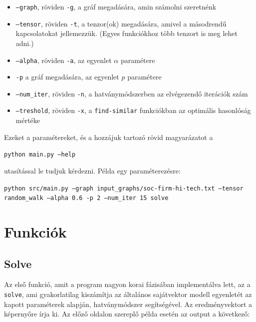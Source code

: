\documentclass[12pt,numbers=noenddot]{report}
\begin{document}
\begin{itemize}
	\item \texttt{--graph}, röviden \texttt{-g}, a gráf megadására, 
		amin számolni szeretnénk
	\item \texttt{--tensor}, röviden \texttt{-t}, a tenzor(ok) megadására, 
		amivel a másodrendű kapcsolatokat jellemezzük. 
		(Egyes funkciókhoz több tenzort is meg lehet adni.)
	\item \texttt{--alpha}, röviden \texttt{-a}, az egyenlet $\alpha$ paramétere
	\item \texttt{-p} a gráf megadására, az egyenlet $p$ paramétere
	\item \texttt{--num\_iter}, röviden \texttt{-n}, a hatványmódszerben az 
		elvégezendő iterációk szám
	\item \texttt{--treshold}, röviden \texttt{-x}, a \texttt{find-similar} 
		funkciókban az optimális hasonlóság mértéke
\end{itemize}

\noindent
Ezeket a paramétereket, és a hozzájuk tartozó rövid magyarázatot a

\texttt{python main.py --help}

\noindent
utasítással le tudjuk kérdezni.
Példa egy paraméterezésre:

\texttt{python src/main.py --graph input\_graphs/soc-firm-hi-tech.txt --tensor random\_walk --alpha 0.6 -p 2 --num\_iter 15 solve}



\chapter{Funkciók}


\section{Solve}

Az első funkció, amit a program nagyon korai fázisában implementálva lett, 
az a \texttt{solve}, ami gyakorlatilag kiszámítja az általános sajátvektor 
modell egyenletét az kapott paraméterek alapján, hatványmódszer segítségével.
Az eredményvektort a képernyőre írja ki. Az előző oldalon szereplő példa esetén
az output a következő:

\vspace{0.4cm}
\end{document}
